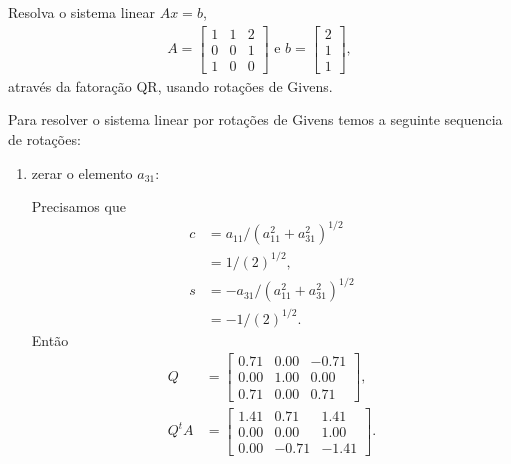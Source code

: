 \documentclass[a4paper,12pt, leqno, answers]{exam}
\begin{document}
\begin{questions}
    \question Resolva o sistema linear $A x = b$,
    \begin{align*}
        A = \begin{bmatrix}
            1 & 1 & 2 \\
            0 & 0 & 1 \\
            1 & 0 & 0
        \end{bmatrix} \text{ e } b = \begin{bmatrix}
            2 \\
            1 \\
            1
        \end{bmatrix},
    \end{align*}
    atrav\'{e}s da fatora\c{c}\~{a}o QR, usando rota\c{c}\~{o}es de Givens.
    \begin{solution}
        Para resolver o sistema linear por rota\c{c}\~{o}es de Givens temos a seguinte sequencia de rota\c{c}\~{o}es:
        \begin{enumerate}
            \item zerar o elemento $a_{31}$:

                Precisamos que
                \begin{align*}
                    c &= a_{11} / \left( a_{11}^2 + a_{31}^2 \right)^{1 / 2} \\
                    &= 1 / \left( 2 \right)^{1 / 2}, \\
                    s &= -a_{31} / \left( a_{11}^2 + a_{31}^2 \right)^{1 / 2} \\
                    &= -1 / \left( 2 \right)^{1 / 2}.
                \end{align*}
                Ent\~{a}o
                \begin{align*}
                    Q &= \begin{bmatrix}
                        0.71 & 0.00 & -0.71 \\
                        0.00 & 1.00 & 0.00 \\
                        0.71 & 0.00 & 0.71
                    \end{bmatrix}, \\
                    Q^t A &= \begin{bmatrix}
                        1.41 & 0.71 & 1.41 \\
                        0.00 & 0.00 & 1.00 \\
                        0.00 & -0.71 & -1.41
                    \end{bmatrix}.
                \end{align*}


\end{enumerate}
\end{solution}
\end{questions}
\end{document}
